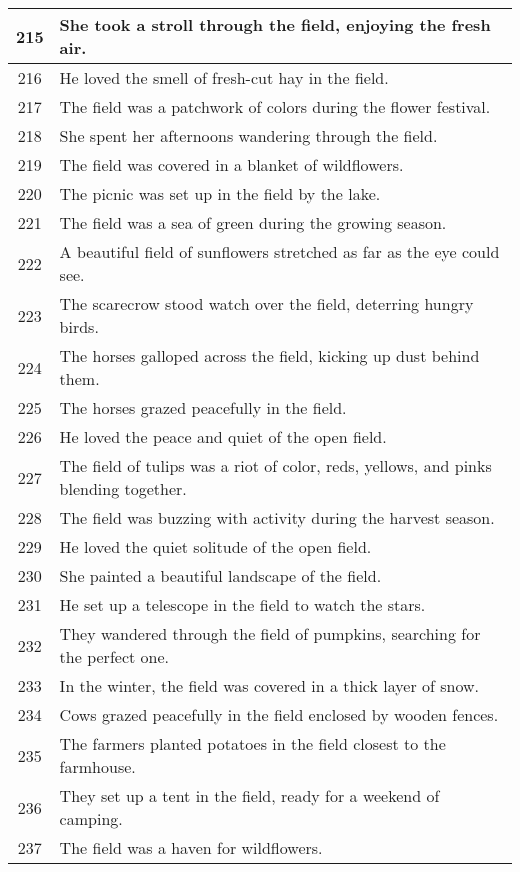 \begin{longtable}{|c|p{12cm}|}
215 & She took a stroll through the field, enjoying the fresh air. \\ \hline
216 & He loved the smell of fresh-cut hay in the field. \\ \hline
217 & The field was a patchwork of colors during the flower festival. \\ \hline
218 & She spent her afternoons wandering through the field. \\ \hline
219 & The field was covered in a blanket of wildflowers. \\ \hline
220 & The picnic was set up in the field by the lake. \\ \hline
221 & The field was a sea of green during the growing season. \\ \hline
222 & A beautiful field of sunflowers stretched as far as the eye could see. \\ \hline
223 & The scarecrow stood watch over the field, deterring hungry birds. \\ \hline
224 & The horses galloped across the field, kicking up dust behind them. \\ \hline
225 & The horses grazed peacefully in the field. \\ \hline
226 & He loved the peace and quiet of the open field. \\ \hline
227 & The field of tulips was a riot of color, reds, yellows, and pinks blending together. \\ \hline
228 & The field was buzzing with activity during the harvest season. \\ \hline
229 & He loved the quiet solitude of the open field. \\ \hline
230 & She painted a beautiful landscape of the field. \\ \hline
231 & He set up a telescope in the field to watch the stars. \\ \hline
232 & They wandered through the field of pumpkins, searching for the perfect one. \\ \hline
233 & In the winter, the field was covered in a thick layer of snow. \\ \hline
234 & Cows grazed peacefully in the field enclosed by wooden fences. \\ \hline
235 & The farmers planted potatoes in the field closest to the farmhouse. \\ \hline
236 & They set up a tent in the field, ready for a weekend of camping. \\ \hline
237 & The field was a haven for wildflowers. \\ \hline

\end{longtable}
